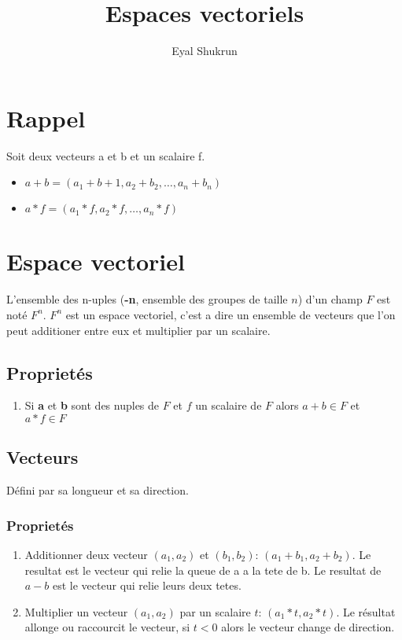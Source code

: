 \documentclass[12pt]{article}
\title{Espaces vectoriels}
\author{Eyal Shukrun}
\begin{document}
\maketitle

\section{Rappel}
Soit deux vecteurs a et b et un scalaire f.
  \begin{itemize}
    \item $a+b = (a_1+b+1, a_2+b_2, \ldots, a_n + b_n)$
    \item $a*f = (a_1*f, a_2*f, \ldots, a_n*f)$
  \end{itemize}  

\section{Espace vectoriel}
L'ensemble des n-uples (\textbf{-n}, ensemble des groupes de taille $n$) d'un champ $F$ est noté $F^n$. $F^n$ est un espace vectoriel, c'est a dire un ensemble de vecteurs que l'on peut additioner entre eux et multiplier par un scalaire.  
  
\subsection{Proprietés}
\begin{enumerate}
  \item Si \textbf{a} et \textbf{b} sont des nuples de $F$ et $f$ un scalaire de $F$ alors $a+b \in F$ et $a*f \in F$
\end{enumerate}
 
\subsection{Vecteurs}
Défini par sa longueur et sa direction. 

\subsubsection{Proprietés}
\begin{enumerate}
  \item Additionner deux vecteur $(a_1, a_2)$ et $(b_1, b_2)$: $(a_1+b_1, a_2+b_2)$. Le resultat est le vecteur qui relie la queue de a a la tete de b. Le resultat de $a-b$ est le vecteur qui relie leurs deux tetes.     
  \item Multiplier un vecteur $(a_1, a_2)$ par un scalaire $t$: $(a_1*t, a_2*t)$. Le résultat allonge ou raccourcit le vecteur, si $t < 0$ alors le vecteur change de direction.
\end{enumerate}
\end{document}
